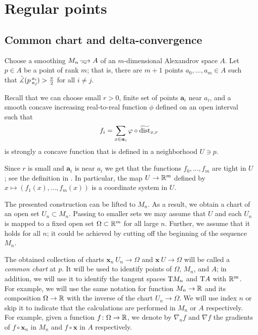 \section{Regular points}\label{sec:ref}

\subsection{Common chart and delta-convergence}

Choose a smoothing $M_n\smooths{} A$ of an $m$-dimensional Alexandrov space $A$.
Let $p\in A$ be a point of rank $m$; that is, there are $m+1$ points $a_0,\dots, a_m\in A$ such that 
$\tilde\measuredangle(p\,{}^{a_i}_{a_j}\hspace{-0.2ex})>\tfrac\pi2$ for all $i\ne j$.

Recall \cite[Sec. 7]{petrunin-conc} that we can choose small $r>0$,
finite set of points $\bm{a}_i$ near $a_i$,
and a smooth concave increasing real-to-real function $\phi$ defined on an open interval such that 
\[f_i=\sum_{x\in \bm{a}_i}\varphi\circ\widetilde{\operatorname{\rm dist}}_{x,r}\]
is strongly a concave function that is defined in a neighborhood $U\ni p$.

Since $r$ is small and $\bm{a}_i$ is near $a_i$ we get that the functions $f_0, \dots, f_m$ are tight in $U$; see the definition in \cite{petrunin-conc}.
In particular, the map $U\to\mathbb{R}^m$ defined by $x\mapsto (f_1(x),\dots,f_m(x))$ is a coordinate system in $U$.

The presented construction can be lifted to $M_n$.
As a result, we obtain a chart of an open set $U_n\subset M_n$.
Passing to smaller sets we may assume that $U$ and each $U_n$ is mapped to a fixed open set $\Omega\subset\mathbb{R}^m$ for all large $n$.
Further, we assume that it holds for all $n$; it could be achieved by cutting off the beginning of the sequence $M_n$.

The obtained collection of charts $\bm{x}_n\:U_n\to \Omega$ and $\bm{x}\:U\to \Omega$ will be called a \emph{common chart} at $p$.
It will be used to identify points of $\Omega$, $M_n$, and $A$; 
in addition, we will use it to identify the tangent spaces $\mathrm{T} M_n$ and $\mathrm{T} A$ with $\mathbb{R}^m$.
For example, we will use the same notation for function $M_n\to \mathbb{R}$ and its composition $\Omega\to \mathbb{R}$ with the inverse of the chart $U_n\to \Omega$.
We will use index $n$ or skip it to indicate that the calculations are performed in $M_n$ or $A$ respectively.
For example, given a function $f\colon\Omega\to \mathbb{R}$, we denote by $\nabla_nf$ and $\nabla f$ the gradients of $f\circ \bm{x}_n$ in $M_n$ and $f\circ \bm{x}$ in $A$ respectively.

